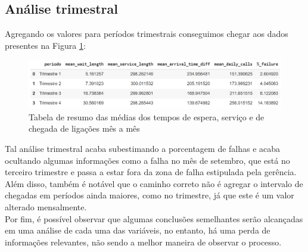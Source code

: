 \subsection{Análise trimestral}
Agregando os valores para períodos trimestrais conseguimos chegar aos dados presentes na Figura \ref*{fig: tritab_img}:

\begin{figure}[H]
    \includegraphics[scale=0.7]{analise-de-dados/trimestral/tritab.png}
    \caption{Tabela de resumo das médias dos tempos de espera, serviço e de chegada de ligações mês a mês}
    \label{fig: tritab_img}
\end{figure}

Tal análise trimestral acaba subestimando a porcentagem de falhas e acaba ocultando algumas informações como a falha no mês de setembro, que está no terceiro trimestre e passa a estar fora da zona de falha estipulada pela gerência.\\
Além disso, também é notável que o caminho correto não é agregar o intervalo de chegadas em períodos ainda maiores, como no trimestre, já que este é um valor alterado mensalmente.\\
Por fim, é possível observar que algumas conclusões semelhantes serão alcançadas em uma análise de cada uma das variáveis, no entanto, há uma perda de informações relevantes, não sendo a melhor maneira de observar o processo.\\